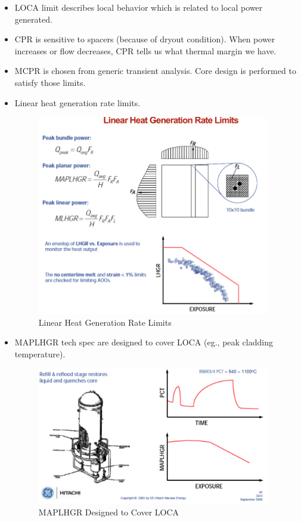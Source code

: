 \documentclass{school-22.211-notes}
\begin{document}
\begin{itemize}
\item LOCA limit describes local behavior which is related to local power generated. 
\item CPR is sensitive to spacers (because of dryout condition). When power increases or flow decreases, CPR tells us what thermal margin we have. 
\item MCPR is chosen from generic transient analysis. Core design is performed to satisfy those limits. 
\item Linear heat generation rate limits.
  \begin{figure}[ht]
    \centering
    \includegraphics[width=4in]{images/design/BWR-LHGR.png}
    \caption{Linear Heat Generation Rate Limits} 
  \end{figure}
\item MAPLHGR tech spec are designed to cover LOCA (eg., peak cladding temperature). 
  \begin{figure}[ht]
    \centering
    \includegraphics[width=4in]{images/design/BWR-MAPLHGR.png}
    \caption{MAPLHGR Designed to Cover LOCA} 
    \end{figure}
\end{itemize}
\end{document}
